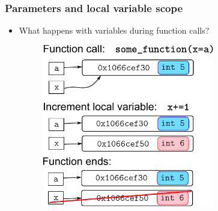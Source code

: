 \documentclass[xcolor=table]{beamer}
\begin{document}
    \begin{frame}[fragile]
\frametitle{Parameters and local variable scope}
        \begin{itemize}
            \item What happens with variables during function calls?
        \begin{figure}\centering%
            \vspace{1ex}%
            \includegraphics[width = 75mm]{functionParameters.pdf}
        \end{figure}
    \end{itemize}
\end{frame}

\end{document}
